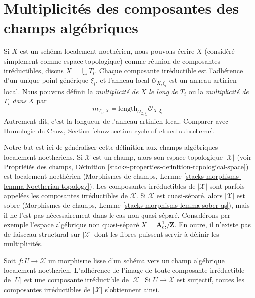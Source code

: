 \section{Multiplicités des composantes des champs algébriques}
\label{section-multiplicities}

\noindent
Si $X$ est un schéma localement noethérien, nous pouvons écrire $X$ (considéré
simplement comme espace topologique) comme réunion de composantes irréductibles,
disons $X = \bigcup T_i$. Chaque composante irréductible est l'adhérence d'un
unique point générique $\xi_i$, et l'anneau local $\mathcal O_{X,\xi_i}$
est un anneau artinien local. Nous pouvons définir la {\it multiplicité de $X$ le long de $T_i$}
ou la {\it multiplicité de $T_i$ dans $X$} par
$$
m_{T_i, X} = \text{length}_{\mathcal O_{X, \xi_i}} \mathcal O_{X, \xi_i}
$$
Autrement dit, c'est la longueur de l'anneau artinien local. Comparer
avec
Homologie de Chow, Section \ref{chow-section-cycle-of-closed-subscheme}.

\medskip\noindent
Notre but est ici de généraliser cette définition aux champs algébriques
localement noethériens. Si $\mathcal{X}$ est un champ,
alors son espace topologique $|\mathcal{X}|$
(voir Propriétés des champs, Définition
\ref{stacks-properties-definition-topological-space})
est localement noethérien
(Morphismes de champs, Lemme \ref{stacks-morphisms-lemma-Noetherian-topology}).
Les composantes irréductibles de $|\mathcal{X}|$ sont parfois
appelées les composantes irréductibles de $\mathcal{X}$.
Si $\mathcal{X}$ est quasi-séparé, alors $|\mathcal{X}|$
est sobre (Morphismes de champs, Lemme
\ref{stacks-morphisms-lemma-sober-qs}),
mais il ne l'est pas nécessairement dans le cas
non quasi-séparé. Considérons par exemple l'espace algébrique non quasi-séparé
$X = \mathbf{A}^1_\mathbf{C}/\mathbf{Z}$.
En outre, il n'existe pas de faisceau structural
sur $|\mathcal{X}|$ dont les fibres puissent servir à définir les multiplicités.

\begin{lemma}
\label{lemma-map-of-components}
Soit $f : U \to \mathcal{X}$ un morphisme lisse d'un schéma
vers un champ algébrique localement noethérien. L'adhérence de l'image de toute
composante irréductible de $|U|$ est une composante irréductible de $|\mathcal{X}|$.
Si $U \to \mathcal{X}$ est surjectif, toutes les composantes irréductibles de
$|\mathcal{X}|$ s'obtiennent ainsi.
\end{lemma}

